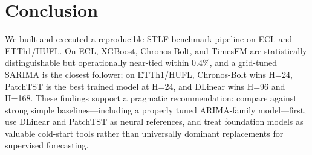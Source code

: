 \documentclass[conference]{IEEEtran}
\begin{document}
\section{Conclusion}
We built and executed a reproducible STLF benchmark pipeline on ECL and ETTh1/HUFL. On ECL, XGBoost, Chronos-Bolt, and TimesFM are statistically distinguishable but operationally near-tied within $0.4\%$, and a grid-tuned SARIMA is the closest follower; on ETTh1/HUFL, Chronos-Bolt wins H=24, PatchTST is the best trained model at H=24, and DLinear wins H=96 and H=168. These findings support a pragmatic recommendation: compare against strong simple baselines---including a properly tuned ARIMA-family model---first, use DLinear and PatchTST as neural references, and treat foundation models as valuable cold-start tools rather than universally dominant replacements for supervised forecasting.



\end{document}
